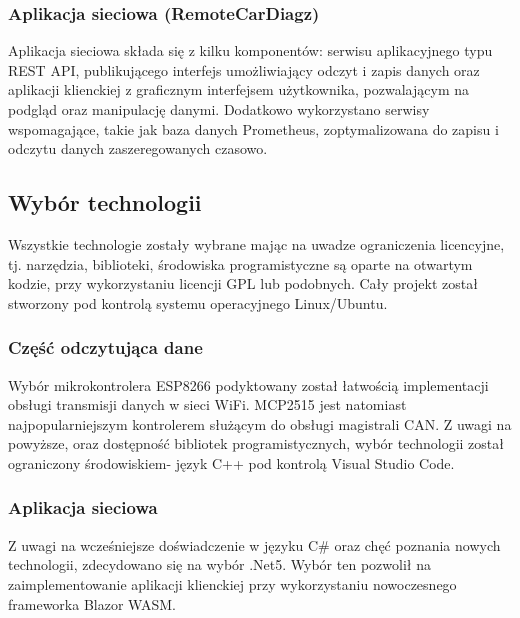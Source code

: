 \documentclass[10pt,a4paper]{article}
\begin{document}
		\subsubsection{Aplikacja sieciowa (RemoteCarDiagz)}
		Aplikacja sieciowa składa się z kilku komponentów: serwisu aplikacyjnego typu REST API, publikującego interfejs umożliwiający odczyt i zapis danych oraz aplikacji klienckiej z graficznym interfejsem użytkownika, pozwalającym na podgląd oraz manipulację danymi. Dodatkowo wykorzystano serwisy wspomagające, takie jak baza danych Prometheus, zoptymalizowana do zapisu i odczytu danych zaszeregowanych czasowo.
		
		\subsection{Wybór technologii}
		Wszystkie technologie zostały wybrane mając na uwadze ograniczenia licencyjne, tj. narzędzia, biblioteki, środowiska programistyczne są oparte na otwartym kodzie, przy wykorzystaniu licencji GPL lub podobnych. Cały projekt został stworzony pod kontrolą systemu operacyjnego Linux/Ubuntu.
			\subsubsection{Część odczytująca dane}
			Wybór mikrokontrolera ESP8266 podyktowany został łatwością implementacji obsługi transmisji danych w sieci WiFi.  MCP2515 jest natomiast najpopularniejszym kontrolerem służącym do obsługi magistrali CAN.  
			Z uwagi na powyższe, oraz dostępność bibliotek programistycznych, wybór technologii został ograniczony środowiskiem- język C++ pod kontrolą Visual Studio Code.
			\subsubsection{Aplikacja sieciowa}
			Z uwagi na wcześniejsze doświadczenie w języku C\# oraz chęć poznania nowych technologii, zdecydowano się na wybór .Net5. Wybór ten pozwolił na zaimplementowanie aplikacji klienckiej przy wykorzystaniu nowoczesnego frameworka Blazor WASM.
	
\end{document}
